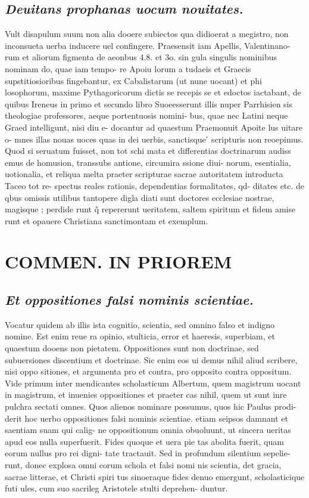 \documentclass{article}
\begin{document}
\begin{pages}
\subsection*{\textit{Deuitans prophanas uocum nouitates. }}\pstart Vult disapulum suum non alia dooere subiectos qua didioerat a megistro, non inconsueta uerba inducere uel confingere. Praesensit iam Apellis, Valentinano- rum et aliorum figmenta de aeonbus 4.8. et 3o. sin gula singulis nominibus nominam do, quae iam tempo- re Apoiu lorum a tudaeis et Graecis supstitiosioribus fingebantur, ex Cabalistarum (ut nune uocant) et phi losophorum, maxime Pythagoricorum dictis se recepis se et edoctos iactabant, de quibus Ireneus in primo et secundo libro Suoeesserunt illis nuper Parrhisien sis theologiae professores, aeque portentuosis nomini- bus, quae nec Latini neque Graed intelligunt, nisi diu e- docantur ad quaestum Praemonuit Apoite lus uitare o- mnes illas nouas uoces quas in dei uerbis, sanctisque ́ scripturis non reoepimus. Quod si seruatum fuisset, non tot schi mata et differentias doctrinarum audiss emus de homusion, transsubs antione, circumira ssione diui- norum, esentialia, uotionalia, et reliqua melta praeter scripturae sacrae autoritatem introducta Taceo tot re- spectus reales rationis, dependentias formalitates, qd- ditates etc. de qbus omissis utilibus tantopere digla diati sunt doctores ecclesiae nostrae, magisque ; perdide runt q̃ repererunt ueritatem, saltem spiritum et fidem amise runt et opauere Christiana sanctimontam et exemplum.  \pend
\section*{COMMEN. IN PRIOREM }
\marginpar{[ p.188 ]}
{}
\subsection*{\textit{Et oppositiones falsi nominis scientiae. }}\pstart Vocatur quidem ab illis ista cognitio, scientia, sed omnino falso et indigno nomine. Est enim reue ra opinio, stulticia, error et haeresis, superbiam, et quaestum dooens non pietatem. Oppositiones sunt non doctrinae, sed subuersiones discentium et doctrinae. Sic enim eos ui demus nihil aliud scribere, nisi oppo sitiones, et argumenta pro et contra, pro opposito contra oppositum. Vide primum inter mendicantes scholasticum Albertum, quem magistrum uocant in magistrum, et inuenies oppositiones et praeter cas nihil, quem ut sunt inre pulchra sectati omnes. Quos alienos nominare possumus, quos hic Paulus prodi- derit hoc uerbo oppositiones falsi nominis scientiae. etiam seipsos damnant et saentiam suam qui calig- ne oppositionum omnia obuoluunt, ut sincera ueritas apud eos nulla superfuerit. Fides quoque et uera pie tas abolita fuerit, quam eorum nullus pro rei digni- tate tractauit. Sed in profundum silentium sepelie- runt, donec explosa omni corum schola et falsi nomi nis scientia, det gracia, sacrae litterae, et Christi spiri tus sinoeraque fides denuo emergunt, scholasticique futi ules, cum suo sacrileg Aristotele stulti deprehen- duntur.  \pend

\end{pages}
\end{document}
